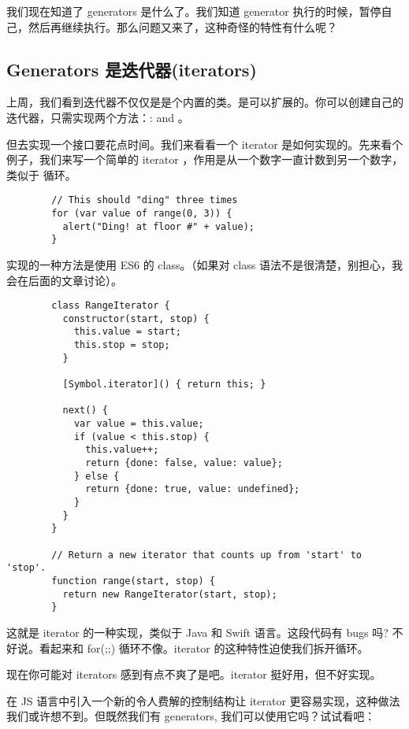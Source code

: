       我们现在知道了 generators 是什么了。我们知道 generator 执行的时候，暂停自己，然后再继续执行。那么问题又来了，这种奇怪的特性有什么呢？

  \subsection{Generators 是迭代器(iterators)}
    \label{subsec:generators_是迭代器_iterators_}
      上周，我们看到迭代器不仅仅是是个内置的类。是可以扩展的。你可以创建自己的迭代器，只需实现两个方法：:  and 。

      但去实现一个接口要花点时间。我们来看看一个 iterator 是如何实现的。先来看个例子，我们来写一个简单的  iterator ，作用是从一个数字一直计数到另一个数字，类似于  循环。

      \begin{lstlisting}
        // This should "ding" three times
        for (var value of range(0, 3)) {
          alert("Ding! at floor #" + value);
        }
      \end{lstlisting}

      实现的一种方法是使用 ES6 的 class。（如果对 class 语法不是很清楚，别担心，我会在后面的文章讨论）。

      \begin{lstlisting}
        class RangeIterator {
          constructor(start, stop) {
            this.value = start;
            this.stop = stop;
          }

          [Symbol.iterator]() { return this; }

          next() {
            var value = this.value;
            if (value < this.stop) {
              this.value++;
              return {done: false, value: value};
            } else {
              return {done: true, value: undefined};
            }
          }
        }

        // Return a new iterator that counts up from 'start' to 'stop'.
        function range(start, stop) {
          return new RangeIterator(start, stop);
        }
      \end{lstlisting}

      这就是 iterator 的一种实现，类似于 Java 和 Swift 语言。这段代码有 bugs 吗? 不好说。看起来和 for(;;) 循环不像。iterator 的这种特性迫使我们拆开循环。

      现在你可能对 iterators 感到有点不爽了是吧。iterator 挺好用，但不好实现。

      在 JS 语言中引入一个新的令人费解的控制结构让 iterator 更容易实现，这种做法我们或许想不到。但既然我们有 generators, 我们可以使用它吗？试试看吧：

